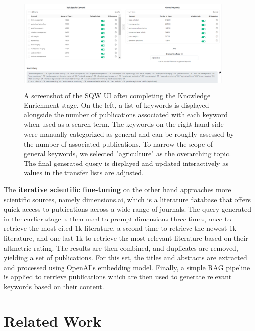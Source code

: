 \begin{figure}
	\centering
	\includegraphics[height=180px, width=400px]{pics/sqw-stage1.png}
	\caption[SQW Knowledge Enrichment]{A screenshot of the SQW UI after completing the Knowledge Enrichment stage. On the left, a list of keywords is displayed alongside the number of publications associated with each keyword when used as a search term. The keywords on the right-hand side were manually categorized as general and can be roughly assessed by the number of associated publications. To narrow the scope of general keywords, we selected "agriculture" as the overarching topic. The final generated query is displayed and updated interactively as values in the transfer lists are adjusted.}
	\label{fig:sqw-stage1}
\end{figure}


The \textbf{iterative scientific fine-tuning} on the other hand approaches more scientific sources, namely dimensions.ai, which is a literature database that offers quick access to publications across a wide range of journals. The query generated in the earlier stage is then used to prompt dimensions three times, once to retrieve the most cited 1k literature, a second time to retrieve the newest 1k literature, and one last 1k to retrieve the most relevant literature based on their altmetric rating. The results are then combined, and duplicates are removed, yielding a set of publications. For this set, the titles and abstracts are extracted and processed using OpenAI's embedding model. Finally, a simple RAG pipeline is applied to retrieve publications which are then used to generate relevant keywords based on their content.

\section{Related Work}\label{sec:relwork}

